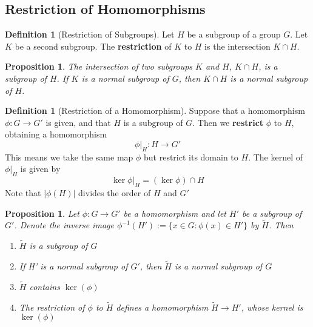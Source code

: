 \documentclass[12pt]{article}
\newtheorem{prop}[thm]{Proposition}
\theoremstyle{definition}
\newtheorem{defn}[thm]{Definition}
\theoremstyle{remark}
\numberwithin{equation}{section}
\newcommand\B[1]{\textbf{ #1}}
\begin{document}
\subsection{Restriction of Homomorphisms}


\begin{defn}[Restriction of Subgroups]
        Let $H$ be a subgroup of a group $G$. Let $K$ be a second subgroup. The \B{restriction} of $K$ to $H$ is the intersection $K\cap H$.
\end{defn}

\vspace{15pt}

\begin{prop}
        The intersection of two subgroups $K$ and $H$, $K\cap H$, is a subgroup of $H$. If $K$ is a normal subgroup of $G$, then $K\cap H$ is a normal subgroup of $H$.
\end{prop}

\vspace{15pt}

\begin{defn}[Restriction of a Homomorphism]
        Suppose that a homomorphism $\phi:G\rightarrow G'$ is given, and that $H$ is a subgroup of $G$. Then we \B{restrict} $\phi$ to $H$, obtaining a homomorphism \begin{equation}
                \phi\Big\vert_H : H \rightarrow G'
        \end{equation}
        This means we take the same map $\phi$ but restrict its domain to $H$. The kernel of $\phi\Big\vert_H$ is given by \begin{equation}
                \ker\phi\Big\vert_H = (\ker \phi) \cap H
        \end{equation}
        Note that $|\phi(H)|$ divides the order of $H$ and $G'$
\end{defn}

\vspace{15pt}

\begin{prop}
        Let $\phi:G\rightarrow G'$ be a homomorphism and let $H'$ be a subgroup of $G'$. Denote the inverse image $\phi^{-1}(H'):=\{x\in G:\phi(x) \in H'\}$ by $\widetilde{H}$. Then \begin{enumerate}
                \item $\widetilde{H}$ is a subgroup of $G$
                \item If H' is a normal subgroup of $G'$, then $\widetilde{H}$ is a normal subgroup of $G$
                \item $\widetilde{H}$ contains $\ker(\phi)$
                \item The restriction of $\phi$ to $\widetilde{H}$ defines a homomorphism $\widetilde{H}\rightarrow H'$, whose kernel is $\ker(\phi)$
        \end{enumerate}
\end{prop}
\end{document}
